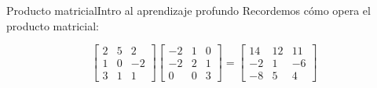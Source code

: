 \documentclass[10pt,border=3pt,tikz]{beamer}
\begin{document}
    \begin{frame}{Producto matricial}{Intro al aprendizaje profundo}
        Recordemos cómo opera el producto matricial:
        
        $$\begin{bmatrix}
            2 & 5 & 2\\
            1 & 0 & -2\\
            3 & 1 & 1
        \end{bmatrix}
        \begin{bmatrix}
            -2 & 1 & 0\\
            -2 & 2 & 1\\
            0 & 0 & 3
        \end{bmatrix} = 
        \begin{bmatrix}
            14 & 12 & 11\\
            -2 & 1 & -6\\
            -8 & 5 & 4
        \end{bmatrix}$$
    \end{frame}
    
\end{document}
